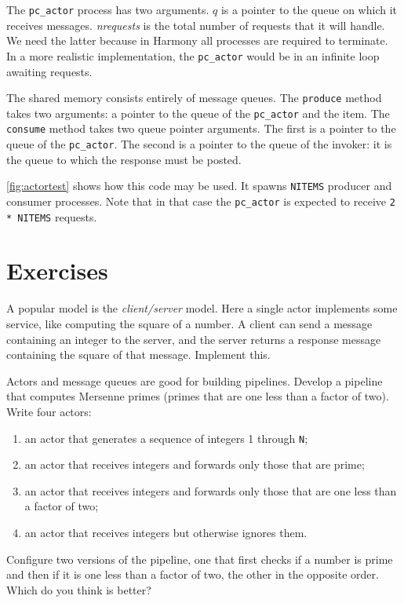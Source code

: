 \documentclass{report}
\begin{document}
The \texttt{pc\_actor} process has two arguments.  $q$ is a pointer
to the queue on which it receives messages.  \textit{nrequests} is the total
number of requests that it will handle.  We need the latter because in Harmony
all processes are required to terminate.  In a more realistic implementation,
the \texttt{pc\_actor} would be in an infinite loop awaiting requests.

The shared memory consists entirely of message queues.
The \texttt{produce} method takes two arguments: a pointer to the queue
of the \texttt{pc\_actor} and the item.  The \texttt{consume} method
takes two queue pointer arguments.  The first is a pointer to the queue
of the \texttt{pc\_actor}.  The second is a pointer to the queue of the
invoker: it is the queue to which the response must be posted.

\autoref{fig:actortest} shows how this code may be used.  It spawns
\texttt{NITEMS} producer and consumer processes.  Note that in that
case the \texttt{pc\_actor} is expected to receive \texttt{2 * NITEMS}
requests.

\section*{Exercises}
\begin{problems}
\item \label{ex:cltsvr} A popular model is the \emph{client/server} model.
Here a single actor implements some service, like computing the square of a
number.
A client can send a message containing an integer to the server, and the
server returns a response message containing the square of that message.
Implement this.
\item Actors and message queues are good for building pipelines.
Develop a pipeline that computes Mersenne primes (primes that are one less
than a factor of two).  Write four actors:
\begin{enumerate}
\item an actor that generates a sequence of integers 1 through \texttt{N};
\item an actor that receives integers and forwards only those that are prime;
\item an actor that receives integers and forwards only those that are one
less than a factor of two;
\item an actor that receives integers but otherwise ignores them.
\end{enumerate}
Configure two versions of the pipeline, one that first checks if a number
is prime and then if it is one less than a factor of two, the other
in the opposite order.  Which do you think is better?
\end{problems}
\end{document}
